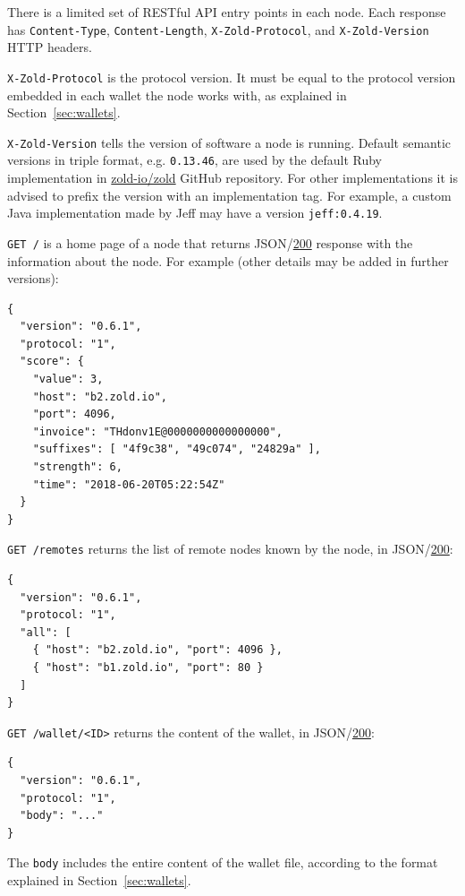 \documentclass[11pt,oneside]{article}
\newcommand\dd[1]{\colorbox{gray!30}{\texttt{#1}}}
\begin{document}
There is a limited set of RESTful API entry points in each node.
Each response has \dd{Content-Type},
\dd{Content-Length}, \dd{X-Zold-Protocol}, and \dd{X-Zold-Version}
HTTP headers.

\dd{X-Zold-Protocol} is the protocol version.
It must be equal to the protocol version embedded in each wallet the
node works with, as explained in Section~\ref{sec:wallets}.

\dd{X-Zold-Version} tells the version of software a node is running.
Default semantic versions in triple format, e.g. \dd{0.13.46}, are used
by the default Ruby implementation in
\href{https://github.com/zold-io/zold}{zold-io/zold} GitHub repository.
For other implementations it is
advised to prefix the version with an implementation tag. For example,
a custom Java implementation made by Jeff may have a version \dd{jeff:0.4.19}.

\dd{GET /} is a home page of a node that returns
JSON/\href{https://www.w3.org/Protocols/rfc2616/rfc2616-sec10.html#sec10.2.1}{200}
response with the
information about the node. For example (other details may be added in
further versions):

\begin{verbatim}
{
  "version": "0.6.1",
  "protocol: "1",
  "score": {
    "value": 3,
    "host": "b2.zold.io",
    "port": 4096,
    "invoice": "THdonv1E@0000000000000000",
    "suffixes": [ "4f9c38", "49c074", "24829a" ],
    "strength": 6,
    "time": "2018-06-20T05:22:54Z"
  }
}
\end{verbatim}

\dd{GET /remotes} returns the list of remote nodes known by the node,
in JSON/\href{https://www.w3.org/Protocols/rfc2616/rfc2616-sec10.html#sec10.2.1}{200}:

\begin{verbatim}
{
  "version": "0.6.1",
  "protocol: "1",
  "all": [
    { "host": "b2.zold.io", "port": 4096 },
    { "host": "b1.zold.io", "port": 80 }
  ]
}\end{verbatim}

\dd{GET /wallet/<ID>} returns the content of the wallet, in
JSON/\href{https://www.w3.org/Protocols/rfc2616/rfc2616-sec10.html#sec10.2.1}{200}:

\begin{verbatim}
{
  "version": "0.6.1",
  "protocol: "1",
  "body": "..."
}\end{verbatim}

The \dd{body} includes the entire content of the wallet file, according
to the format explained in Section~\ref{sec:wallets}.
\end{document}
